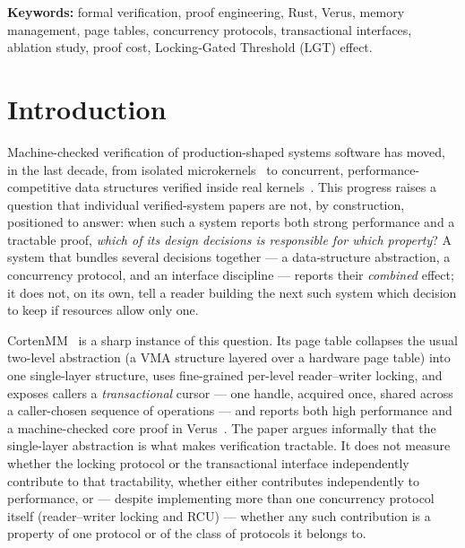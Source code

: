 \documentclass[10pt]{article}
\begin{document}
\begin{abstract}
$13.6\times$ (\texttt{mmap}) and up to $40\times$ (\texttt{mprotect})
the transactional convention's cost as operation-range size grows, and
that advantage collapses toward parity once realistic per-object work
(e.g.\ page faults) dominates, exactly as the model predicts. We
report these findings, the models that explain them, and their
explicit scope and non-claims --- including that three of our six
variants remain blocked from a clean 0-error result by two
documented, independent Verus tooling limitations --- positioned within a four-axis
classification of the memory-management design space that separates
interface atomicity from abstraction layering and concurrency protocol
as its own, independently variable axis.
\end{abstract}

\noindent\textbf{Keywords:} formal verification, proof engineering,
Rust, Verus, memory management, page tables, concurrency protocols,
transactional interfaces, ablation study, proof cost, Locking-Gated
Threshold (LGT) effect.



\section{Introduction}
\label{sec:intro}

Machine-checked verification of production-shaped systems software has
moved, in the last decade, from isolated microkernels~\cite{sel4} to
concurrent, performance-competitive data structures verified inside
real kernels~\cite{cortenmm}. This progress raises a question that
individual verified-system papers are not, by construction, positioned
to answer: when such a system reports both strong performance and a
tractable proof, \emph{which of its design decisions is responsible for
which property}? A system that bundles several decisions together ---
a data-structure abstraction, a concurrency protocol, and an interface
discipline --- reports their \emph{combined} effect; it does not, on its
own, tell a reader building the next such system which decision to
keep if resources allow only one.

CortenMM~\cite{cortenmm} is a sharp instance of this question.
Its page table collapses the usual two-level abstraction (a VMA
structure layered over a hardware page table) into one single-layer
structure, uses fine-grained per-level reader--writer locking, and
exposes callers a \emph{transactional} cursor --- one handle, acquired
once, shared across a caller-chosen sequence of operations --- and
reports both high performance and a machine-checked core proof in
Verus~\cite{verus}. The paper argues informally that the single-layer abstraction is
what makes verification tractable. It does not measure whether the
locking protocol or the transactional interface independently
contribute to that tractability, whether either contributes
independently to performance, or --- despite implementing more than
one concurrency protocol itself (reader--writer locking and RCU) ---
whether any such contribution is a property of one protocol or of the
class of protocols it belongs to.
\end{document}
